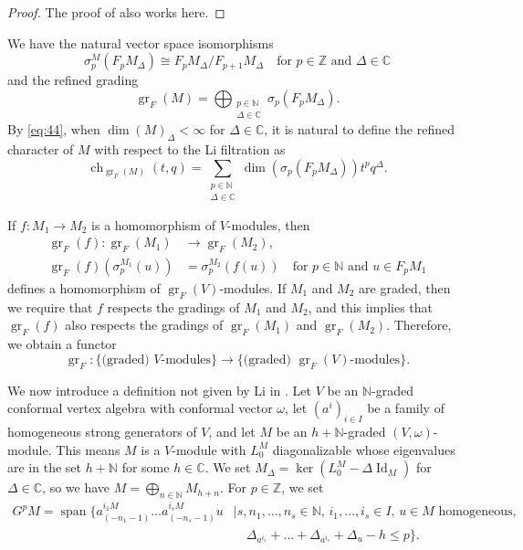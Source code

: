 \documentclass[a4paper, 12pt, reqno]{amsart}
\theoremstyle{remark}
\DeclareMathOperator{\Id}{Id}
\DeclareMathOperator{\gr}{gr}
\DeclareMathOperator{\ch}{ch}
\DeclareMathOperator{\vspan}{span}
\begin{document}
\begin{proof}
  The proof of  also works here.
\end{proof}

We have the natural vector space isomorphisms
\begin{equation*}
  \sigma^M_p(F_pM_{\Delta}) \cong F_pM_{\Delta}/F_{p + 1}M_{\Delta} \quad \text{for $p \in \mathbb{Z}$ and $\Delta \in \mathbb{C}$}
\end{equation*}
and the refined grading
\begin{equation}
  \label{eq:44}
  \gr_F(M) = \bigoplus_{\substack{p \in \mathbb{N} \\ \Delta \in \mathbb{C}}}\sigma_p(F_pM_{\Delta}).
\end{equation}
By \eqref{eq:44}, when $\dim(M)_{\Delta} < \infty$ for $\Delta \in \mathbb{C}$, it is natural to define the refined character of $M$ with respect to the Li filtration as
\begin{equation*}
  \ch_{\gr_F(M)}(t, q) = \sum_{\substack{p \in \mathbb{N} \\ \Delta \in \mathbb{C}}}\dim(\sigma_p(F_pM_{\Delta}))t^pq^{\Delta}.
\end{equation*}

If $f: M_1 \to M_2$ is a homomorphism of $V$-modules, then
\begin{align*}
  \gr_F(f): \gr_F(M_1) &\to \gr_F(M_2), \\
  \gr_F(f)(\sigma^{M_1}_p(u)) &= \sigma^{M_2}_p(f(u)) \quad \text{for $p \in \mathbb{N}$ and $u \in F_pM_1$}
\end{align*}
defines a homomorphism of $\gr_F(V)$-modules.
If $M_1$ and $M_2$ are graded, then we require that $f$ respects the gradings of $M_1$ and $M_2$, and this implies that $\gr_F(f)$ also respects the gradings of $\gr_F(M_1)$ and $\gr_F(M_2)$.
Therefore, we obtain a functor
\begin{equation*}
  \gr_F: \{\text{(graded) $V$-modules}\} \to \{\text{(graded) $\gr_F(V)$-modules}\}.
\end{equation*}

We now introduce a definition not given by Li in \cite{li_vertex_2004}.
Let $V$ be an $\mathbb{N}$-graded conformal vertex algebra with conformal vector $\omega$, let $(a^i)_{i \in I}$ be a family of homogeneous strong generators of $V$, and let $M$ be an $h + \mathbb{N}$-graded $(V, \omega)$-module.
This means $M$ is a $V$-module with $L_0^M$ diagonalizable whose eigenvalues are in the set $h + \mathbb{N}$ for some $h \in \mathbb{C}$.
We set $M_{\Delta} = \ker(L^M_0 - \Delta\Id_M)$ for $\Delta \in \mathbb{C}$, so we have $M = \bigoplus_{n \in \mathbb{N}}M_{h + n}$.
For $p \in \mathbb{Z}$, we set
\begin{equation*}
  \begin{split}
    G^pM = \vspan\{a^{i_1M}_{(-n_1 - 1)}\dots a^{i_sM}_{(-n_s - 1)}u &\mid \text{$s, n_1, \dots, n_s \in \mathbb{N}$, $i_1, \dots, i_s \in I$, $u \in M$ homogeneous,} \\
                                                                     &\quad \Delta_{a^{i_1}} + \dots + \Delta_{a^{i_s}} + \Delta_u - h \le p\}.
  \end{split}
\end{equation*}
\end{document}
